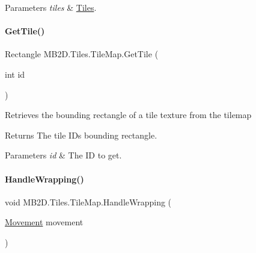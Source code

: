 \begin{DoxyParams}{Parameters}
{\em tiles} & \hyperlink{namespace_m_b2_d_1_1_tiles}{Tiles}.\\
\hline
\end{DoxyParams}
\hypertarget{class_m_b2_d_1_1_tiles_1_1_tile_map_a483549827f26a5282888728f20b56a8a}{}\label{class_m_b2_d_1_1_tiles_1_1_tile_map_a483549827f26a5282888728f20b56a8a} 
\paragraph{\texorpdfstring{Get\+Tile()}{GetTile()}}
{\footnotesize\ttfamily Rectangle M\+B2\+D.\+Tiles.\+Tile\+Map.\+Get\+Tile (\begin{DoxyParamCaption}\item[{int}]{id }\end{DoxyParamCaption})\hspace{0.3cm}{\ttfamily [inline]}}



Retrieves the bounding rectangle of a tile texture from the tilemap 

\begin{DoxyReturn}{Returns}
The tile ID\textquotesingle{}s bounding rectangle.
\end{DoxyReturn}

\begin{DoxyParams}{Parameters}
{\em id} & The ID to get.\\
\hline
\end{DoxyParams}
\hypertarget{class_m_b2_d_1_1_tiles_1_1_tile_map_ad00d974648e7f3070133569e5e98d261}{}\label{class_m_b2_d_1_1_tiles_1_1_tile_map_ad00d974648e7f3070133569e5e98d261} 
\paragraph{\texorpdfstring{Handle\+Wrapping()}{HandleWrapping()}}
{\footnotesize\ttfamily void M\+B2\+D.\+Tiles.\+Tile\+Map.\+Handle\+Wrapping (\begin{DoxyParamCaption}\item[{\hyperlink{class_m_b2_d_1_1_entity_component_1_1_movement}{Movement}}]{movement }\end{DoxyParamCaption})\hspace{0.3cm}{\ttfamily [inline]}}



